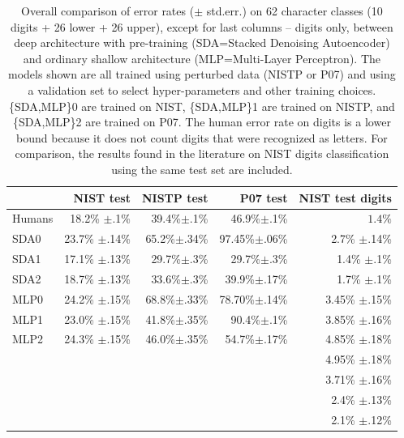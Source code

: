 \documentclass{article} %
\begin{document}
\begin{table}[ht]
\caption{Overall comparison of error rates ($\pm$ std.err.) on 62 character classes (10 digits +
26 lower + 26 upper), except for last columns -- digits only, between deep architecture with pre-training
(SDA=Stacked Denoising Autoencoder) and ordinary shallow architecture 
(MLP=Multi-Layer Perceptron). The models shown are all trained using perturbed data (NISTP or P07)
and using a validation set to select hyper-parameters and other training choices. 
\{SDA,MLP\}0 are trained on NIST,
\{SDA,MLP\}1 are trained on NISTP, and \{SDA,MLP\}2 are trained on P07.
The human error rate on digits is a lower bound because it does not count digits that were
recognized as letters. For comparison, the results found in the literature
on NIST digits classification using the same test set are included.}
\label{tab:sda-vs-mlp-vs-humans}
\begin{center}
\begin{tabular}{|l|r|r|r|r|} \hline
      & NIST test          & NISTP test       & P07 test       & NIST test digits   \\ \hline
Humans&   18.2\% $\pm$.1\%   &  39.4\%$\pm$.1\%   &  46.9\%$\pm$.1\%  &  $1.4\%$ \\ \hline 
SDA0   &  23.7\% $\pm$.14\%  &  65.2\%$\pm$.34\%  & 97.45\%$\pm$.06\%  & 2.7\% $\pm$.14\%\\ \hline 
SDA1   &  17.1\% $\pm$.13\%  &  29.7\%$\pm$.3\%  & 29.7\%$\pm$.3\%  & 1.4\% $\pm$.1\%\\ \hline 
SDA2   &  18.7\% $\pm$.13\%  &  33.6\%$\pm$.3\%  & 39.9\%$\pm$.17\%  & 1.7\% $\pm$.1\%\\ \hline 
MLP0   &  24.2\% $\pm$.15\%  & 68.8\%$\pm$.33\%  & 78.70\%$\pm$.14\%  & 3.45\% $\pm$.15\% \\ \hline 
MLP1   &  23.0\% $\pm$.15\%  &  41.8\%$\pm$.35\%  & 90.4\%$\pm$.1\%  & 3.85\% $\pm$.16\% \\ \hline 
MLP2   &  24.3\% $\pm$.15\%  &  46.0\%$\pm$.35\%  & 54.7\%$\pm$.17\%  & 4.85\% $\pm$.18\% \\ \hline 
\citep{Granger+al-2007} &     &                    &                   & 4.95\% $\pm$.18\% \\ \hline
\citep{Cortes+al-2000-small} &      &                    &                   & 3.71\% $\pm$.16\% \\ \hline
\citep{Oliveira+al-2002} &    &                    &                   & 2.4\% $\pm$.13\% \\ \hline
\citep{Milgram+al-2005} &      &                    &                   & 2.1\% $\pm$.12\% \\ \hline
\end{tabular}
\end{center}
\end{table}
\end{document}
